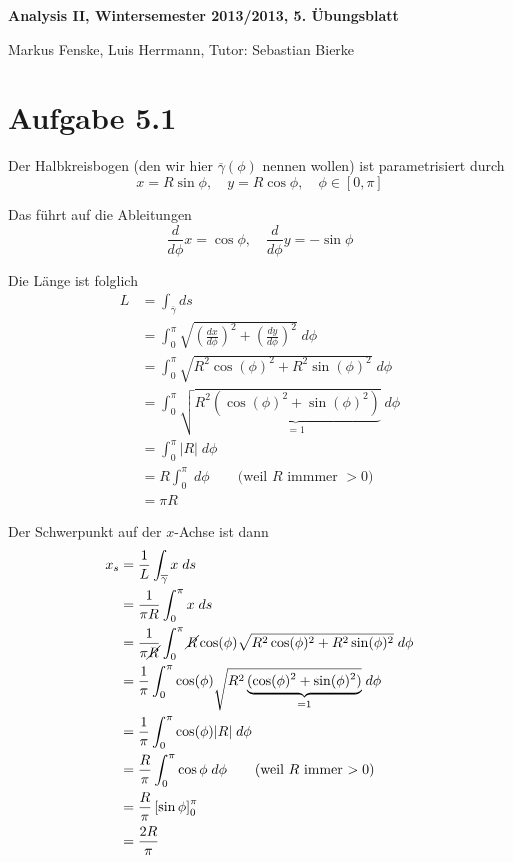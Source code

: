 \documentclass[a4paper,german,12pt,smallheadings]{scrartcl}
\begin{document}
\begin{center}
\bfseries %
\sffamily %
\vspace{-40pt}
Analysis II, Wintersemester 2013/2013, 5. Übungsblatt

Markus Fenske, Luis Herrmann, Tutor: Sebastian Bierke
\vspace{-10pt}
\end{center}

\section*{Aufgabe 5.1}
Der Halbkreisbogen (den wir hier $\overline{\gamma}(\phi)$ nennen wollen) ist
parametrisiert durch
\begin{equation*}
  x = R \sin \phi,\quad y = R \cos \phi, \quad \phi \in [0, \pi]
\end{equation*}

Das führt auf die Ableitungen
\begin{equation*}
  \frac{d}{d \phi} x= \cos \phi,\quad \frac{d}{d \phi} y = -\sin \phi
\end{equation*}

Die Länge ist folglich
\begin{align*}
  L &= \int_{\overline{\gamma}} ds \\ 
    &= \int_0^\pi \sqrt{\left(\frac{dx}{d\phi}\right)^2 + \left(\frac{dy}{d \phi}\right)^2} \; d\phi \\
    &= \int_0^\pi \sqrt{R^2 \cos(\phi)^2 + R^2 \sin(\phi)^2} \; d\phi \\
    &= \int_0^\pi \sqrt{R^2 \underbrace{(\cos(\phi)^2 + \sin(\phi)^2)}_{=1}} \; d\phi \\
    &= \int_0^\pi |R| \; d\phi \\
    &= R \int_0^\pi \; d\phi \qquad \text{(weil $R$ immmer $>0$)} \\
    &= \pi R
\end{align*}

Der Schwerpunkt auf der $x$-Achse ist dann
\begin{align*}
  x_s &= \frac{1}{L} \int_{\overline{\gamma}} x \; ds \\
      &= \frac{1}{\pi R} \int_0^\pi x \; ds \\
      &= \frac{1}{\pi \cancel{R}} \int_0^\pi \cancel{R} \cos(\phi) \sqrt{R^2 \cos(\phi)^2 + R^2 \sin(\phi)^2} \; d\phi \\
      &= \frac{1}{\pi} \int_0^\pi \cos(\phi) \sqrt{R^2 \underbrace{(\cos(\phi)^2 + \sin(\phi)^2)}_{=1}} \; d\phi \\
      &= \frac{1}{\pi} \int_0^\pi \cos(\phi) |R| \; d\phi \\
      &= \frac{R}{\pi} \int_0^\pi \cos \phi  \; d\phi \qquad \text{(weil $R$ immer $>0$)}\\
      &= \frac{R}{\pi} \left[ \sin \phi\right]_0^\pi \\
      &= \frac{2R}{\pi}
\end{align*}
\end{document}

